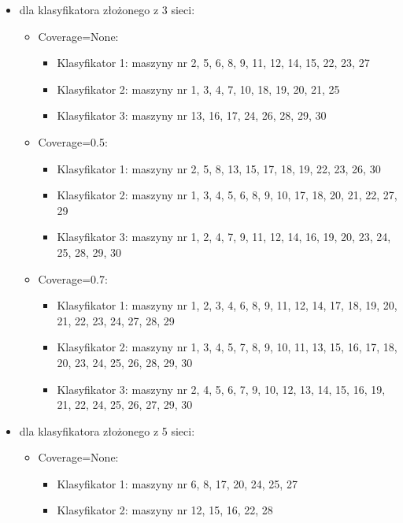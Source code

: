 \documentclass[polish,12pt]{aghthesis}
\begin{document}
\begin{itemize}
    \item dla klasyfikatora złożonego z 3 sieci:
    \begin{itemize}
        \item Coverage=None:
        \begin{itemize}
            \item Klasyfikator 1: maszyny nr 2, 5, 6, 8, 9, 11, 12, 14, 15, 22, 23, 27
            \item Klasyfikator 2: maszyny nr 1, 3, 4, 7, 10, 18, 19, 20, 21, 25
            \item Klasyfikator 3: maszyny nr 13, 16, 17, 24, 26, 28, 29, 30
        \end{itemize}
        \item Coverage=0.5:
        \begin{itemize}
            \item Klasyfikator 1: maszyny nr 2, 5, 8, 13, 15, 17, 18, 19, 22, 23, 26, 30
            \item Klasyfikator 2: maszyny nr 1, 3, 4, 5, 6, 8, 9, 10, 17, 18, 20, 21, 22, 27, 29
            \item Klasyfikator 3: maszyny nr 1, 2, 4, 7, 9, 11, 12, 14, 16, 19, 20, 23, 24, 25, 28, 29, 30
        \end{itemize}
        \item Coverage=0.7:
        \begin{itemize}
            \item Klasyfikator 1: maszyny nr 1, 2, 3, 4, 6, 8, 9, 11, 12, 14, 17, 18, 19, 20, 21, 22, 23, 24, 27, 28, 29
            \item Klasyfikator 2: maszyny nr 1, 3, 4, 5, 7, 8, 9, 10, 11, 13, 15, 16, 17, 18, 20, 23, 24, 25, 26, 28, 29, 30
            \item Klasyfikator 3: maszyny nr 2, 4, 5, 6, 7, 9, 10, 12, 13, 14, 15, 16, 19, 21, 22, 24, 25, 26, 27, 29, 30
        \end{itemize}
    \end{itemize}
    \item dla klasyfikatora złożonego z 5 sieci:
    \begin{itemize}
        \item Coverage=None:
        \begin{itemize}
            \item Klasyfikator 1: maszyny nr 6, 8, 17, 20, 24, 25, 27
            \item Klasyfikator 2: maszyny nr 12, 15, 16, 22, 28

\end{itemize}
\end{itemize}
\end{itemize}
\end{document}
